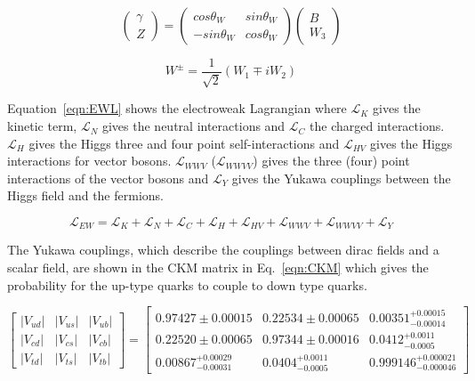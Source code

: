 \begin{equation}
\label{eqn:Zgamma}
\left( \begin{array}{c}
\gamma \\
Z \end{array} \right)
=
\left( \begin{array}{cc}
cos\theta_{W} & sin\theta_{W} \\
-sin\theta_{W} & cos\theta_{W} \end{array} \right)
\left( \begin{array}{c}
B \\
W_{3}\end{array} \right)
\end{equation}

\begin{equation}
\label{eqn:Wpm}
W^{\pm}=\frac{1}{\sqrt{2}}\left(W_{1}\mp iW_{2}\right)
\end{equation}

Equation~\ref{eqn:EWL} shows the electroweak Lagrangian where $\mathcal{L}_{K}$ gives the kinetic term, $\mathcal{L}_{N}$ gives the neutral interactions and $\mathcal{L}_{C}$ the charged interactions. $\mathcal{L}_{H}$ gives the Higgs three and four point self-interactions and  $\mathcal{L}_{HV}$ gives the Higgs interactions for vector bosons.  $\mathcal{L}_{WWV}$ ($\mathcal{L}_{WWVV}$) gives the three (four) point interactions of the vector bosons and $\mathcal{L}_{Y}$ gives the Yukawa couplings between the Higgs field and the fermions.

\begin{equation}
\label{eqn:EWL}
\mathcal{L}_{EW} = \mathcal{L}_{K} + \mathcal{L}_{N} + \mathcal{L}_{C} + \mathcal{L}_{H} + \mathcal{L}_{HV} + \mathcal{L}_{WWV} + \mathcal{L}_{WWVV} + \mathcal{L}_{Y}
\end{equation}

The Yukawa couplings, which describe the couplings between dirac fields and a scalar field, are shown in the CKM matrix in Eq.~\ref{eqn:CKM} which gives the probability for the up-type quarks to couple to down type quarks.

\begin{equation}
\label{eqn:CKM}
{\begin{bmatrix}
|V_{ud}|&|V_{us}|&|V_{ub}|\\|V_{cd}|&|V_{cs}|&|V_{cb}|\\|V_{td}|&|V_{ts}|&|V_{tb}|
\end{bmatrix}}
=
{\begin{bmatrix}0.97427\pm 0.00015&0.22534\pm 0.00065&0.00351_{-0.00014}^{+0.00015}\\0.22520\pm 0.00065&0.97344\pm 0.00016&0.0412_{-0.0005}^{+0.0011}\\0.00867_{-0.00031}^{+0.00029}&0.0404_{-0.0005}^{+0.0011}&0.999146_{-0.000046}^{+0.000021}\end{bmatrix}}
\end{equation}



